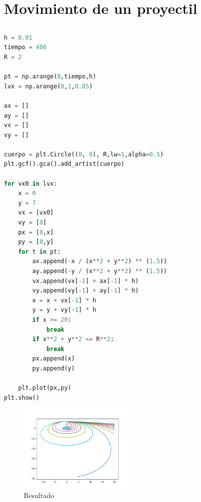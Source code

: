 \documentclass{article}
\begin{document}
\section{Movimiento de un proyectil}
\subsection{}
\begin{lstlisting}[language=Python,caption=1\_1.py]
h = 0.01
tiempo = 400
R = 2

pt = np.arange(0,tiempo,h)
lvx = np.arange(0,1,0.05)

ax = []
ay = []
vx = []
vy = []

cuerpo = plt.Circle((0, 0), R,lw=1,alpha=0.5)
plt.gcf().gca().add_artist(cuerpo)

for vx0 in lvx:
    x = 0
    y = 7
    vx = [vx0]
    vy = [0]
    px = [0,x]
    py = [0,y]
    for t in pt:
        ax.append(-x / (x**2 + y**2) ** (1.5))
        ay.append(-y / (x**2 + y**2) ** (1.5))
        vx.append(vx[-1] + ax[-1] * h)
        vy.append(vy[-1] + ay[-1] * h)
        x = x + vx[-1] * h
        y = y + vy[-1] * h
        if x >= 20:
            break
        if x**2 + y**2 <= R**2:
            break
        px.append(x)
        py.append(y)

    plt.plot(px,py)
plt.show()

\end{lstlisting}
\begin{figure}[H]
    \centering
    \includegraphics[width=0.5\textwidth]{1_1.png}
    \caption{Resultado}
\end{figure}
\end{document}
